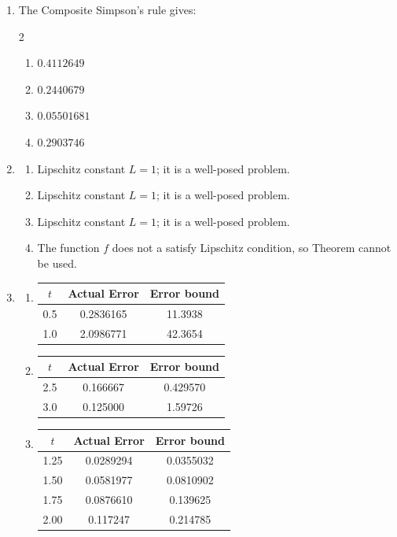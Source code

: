 \begin{posttest}[\textcolor{red}{End of Module 6 Quiz}]
\begin{mysolution}
\begin{enumerate}[label=\arabic*.]
\item The Composite Simpson’s rule gives:
\begin{multicols}{2}
\begin{enumerate}[label=(\alph*)]
\item $0.4112649$ \item $0.2440679$ \item $0.05501681$ \item $0.2903746$
\end{enumerate}
\end{multicols}
\item 
\begin{enumerate}[label=(\alph*)]
\item Lipschitz constant $L=1$; it is a well-posed problem.
\item Lipschitz constant $L=1$; it is a well-posed problem.
\item Lipschitz constant $L=1$; it is a well-posed problem.
\item The function $f$ does not a satisfy Lipschitz condition, so Theorem \label{thm:wellposedcond} cannot be used.
\end{enumerate}
\item 
\begin{enumerate}[label=(\alph*)]
\item
\begin{center}
\begin{tabular}{ccc}
\hline
$t$ & Actual Error & Error bound \\
\hline
0.5 & 0.2836165 & 11.3938 \\
1.0 & 2.0986771 & 42.3654 \\
\hline
\end{tabular}
\end{center}
\item
\begin{center}
\begin{tabular}{ccc}
\hline
$t$ & Actual Error & Error bound \\
\hline
2.5 & 0.166667 & 0.429570 \\
3.0 & 0.125000 & 1.59726 \\
\hline
\end{tabular}
\end{center}
\item
\begin{center}
\begin{tabular}{ccc}
\hline
$t$ & Actual Error & Error bound \\
\hline
1.25 & 0.0289294 & 0.0355032 \\
1.50 & 0.0581977 & 0.0810902 \\
1.75 & 0.0876610 & 0.139625 \\
2.00 & 0.117247 & 0.214785 \\
\hline
\end{tabular}
\end{center}


\end{enumerate}
\end{enumerate}
\end{mysolution}
\end{posttest}
